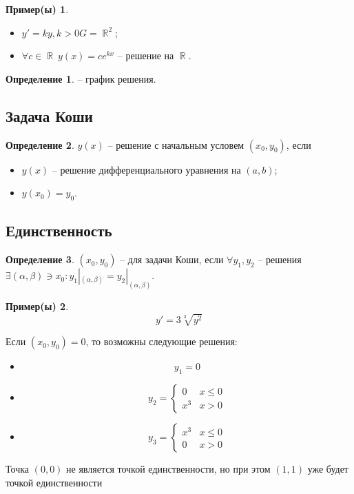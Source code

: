 \documentclass[a4paper]{article}
\theoremstyle{indented}
\theoremstyle{definition}
\newtheorem*{defn}{Определение}
\newtheorem*{exl}{Пример(ы)}
\theoremstyle{remark}
\DeclareMathOperator{\RR}{\mathbb{R}}
\begin{document}
\begin{exl} \ 

  \begin{itemize}
    \item $y' = ky, k > 0 G = \RR^2$;
    \item $\forall c \in \RR \  y(x) = ce^{kx}$ -- решение на $\RR$.
  \end{itemize}
\end{exl}

\begin{defn}
   -- график решения.
\end{defn}

\subsection{Задача Коши}

\begin{defn}
$y(x)$ -- решение  с начальным условем $(x_0,y_0)$, если

\begin{itemize}
    \item $y(x)$ -- решение дифференциального уравнения на $(a,b)$;
    \item $y(x_0) = y_0$.
\end{itemize}
\end{defn}

\subsection{Единственность}
\begin{defn}
  $(x_0,y_0)$ --  для задачи Коши, если $\forall y_1, y_2$ -- решения $\exists (\alpha, \beta) \ni x_0: y_1|_{(\alpha,\beta)} = y_2|_{(\alpha,\beta)}$.
\end{defn}

\begin{exl}
  \[y' = 3 \sqrt[3]{y^2}\]

  Если $(x_0,y_0) = 0$, то возможны следующие решения:

  \begin{itemize}
  \item \[y_1 = 0\]
  \item \[y_2 = \begin{cases}
        0 & x \leqslant 0 \\
        x^3 & x > 0
      \end{cases}\]
  \item \[y_3 = \begin{cases}
        x^3 & x \leqslant 0 \\
        0 & x > 0
      \end{cases}\]
  \end{itemize}
  Точка $(0,0)$ не является точкой единственности, но при этом $(1,1)$ уже будет точкой единственности
\end{exl}
\end{document}
